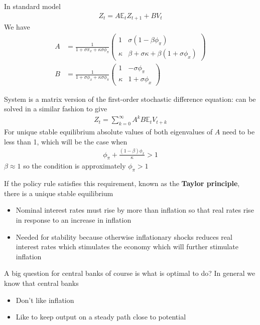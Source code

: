 \documentclass{beamer}
\begin{document}
\begin{frame}
 In standard model
 \begin{align*}
   Z_t=A\mathbb{E}_tZ_{t+1}+BV_t 
 \end{align*}
  We have
  \begin{align}
  A &= \frac{1}{1+\sigma\pi_x + \kappa\sigma\phi_{\pi}} \begin{pmatrix}
    1 & \sigma(1-\beta\phi_{\pi}) \\
    \kappa & \beta + \sigma\kappa + \beta(1+\sigma\phi_x)
      \end{pmatrix}\\
  B &= \frac{1}{1+\sigma\phi_x + \kappa\sigma\phi_{\pi}} \begin{pmatrix}
    1 & -\sigma\phi_{\pi}\\
    \kappa & 1+\sigma\phi_x
  \end{pmatrix}
\end{align}  
\end{frame}

\begin{frame}
  System is a matrix version of the first-order stochastic difference equation: can be solved in a similar fashion to give
\begin{align}
  Z_t=\sum_{k=0}^{\infty}A^k B\mathbb{E}_tV_{t+k}
\end{align}
 For unique stable equilibrium absolute values of both eigenvalues of $A$ need to be less than 1, which will be the case when
\begin{align}  
  \phi_{\pi}+\frac{(1-\beta)\phi_x}{\kappa}>1 
\end{align}
$\beta \approx 1$ so the condition is approximately $\phi_{\pi}>1$
\end{frame}

\begin{frame}
  If the policy rule satisfies this requirement, known as the \textbf{Taylor principle}, there is a unique stable equilibrium
  \begin{itemize}
    \item Nominal interest rates must rise by more than inflation so that real rates rise in response to an increase in inflation
    \item Needed for stability because otherwise inflationary shocks reduces real interest rates which stimulates the economy which will further stimulate inflation
  \end{itemize}
  \medskip
  A big question for central banks of course is what is optimal to do? 
  In general we know that central banks 
\begin{itemize}
  \item Don't like inflation 
  \item Like to keep output on a steady path close to potential
\end{itemize}
\end{frame}
\end{document}

